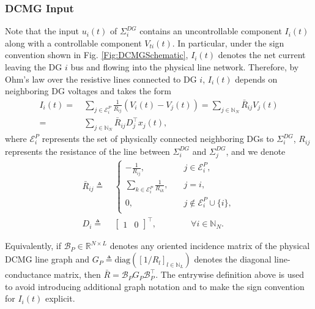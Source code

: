 \documentclass[letterpaper, 10 pt, conference]{ieeeconf}%
\newcommand{\R}{\mathbb{R}}
\newcommand{\N}{\mathbb{N}}
\newcommand{\T}{\top}
\newcommand{\0}{\mathbf{0}}
\newcommand{\E}{\mathcal{E}}
\newcommand{\diag}{\text{diag}}
\newcommand{\bm}[1]{\begin{bmatrix}#1\end{bmatrix}}
\begin{document}
\subsubsection{\textbf{DCMG Input}} Note that the input $u_i(t)$ of $\Sigma_i^{DG}$ contains an uncontrollable component $I_i(t)$ along with a controllable component $V_{ti}(t)$. In particular, under the sign convention shown in Fig. \ref{Fig:DCMGSchematic}, $I_i(t)$ denotes the net current leaving the DG $i$ bus and flowing into the physical line network. Therefore, by Ohm's law over the resistive lines connected to DG $i$, $I_i(t)$ depends on neighboring DG voltages and takes the form
\begin{align}\nonumber
I_i(t) =&\ \sum_{j\in\E_i^P}\frac{1}{R_{ij}}(V_i(t) - V_j(t)) = \sum_{j\in\N_N} \bar{R}_{ij}V_j(t)\\ 
\label{Eq:DGInputPart1}
=&\ \sum_{j\in\N_N} \bar{R}_{ij} D_j^\T x_j(t),
\end{align}
where $\E_i^P$ represents the set of physically connected neighboring DGs to $\Sigma_i^{DG}$, $R_{ij}$ represents the resistance of the line between $\Sigma_i^{DG}$ and $\Sigma_j^{DG}$, and we denote
\begin{equation*}
\begin{aligned}
\bar{R}_{ij} \triangleq&\  
\begin{cases}
-\frac{1}{R_{ij}}, \quad &j \in \E_i^P,\\
\sum_{k \in \E_i^P}\frac{1}{R_{ik}}, \quad &j=i,\\
0, \quad &j \not\in \E_i^P\cup\{i\},\\
\end{cases}\\
D_i \triangleq&\ \bm{1 & 0}^\T, \quad \quad \quad \quad \forall i\in\N_N.
\end{aligned}
\end{equation*}


Equivalently, if $\mathcal{B}_P\in\R^{N\times L}$ denotes any oriented incidence matrix of the physical DCMG line graph and $G_P\triangleq\diag([1/R_l]_{l\in\N_L})$ denotes the diagonal line-conductance matrix, then $\bar R=\mathcal{B}_P G_P \mathcal{B}_P^\T$. The entrywise definition above is used to avoid introducing additional graph notation and to make the sign convention for $I_i(t)$ explicit.
\end{document}
